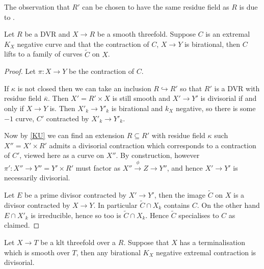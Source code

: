 \documentclass[a4paper,12pt]{amsart}
\begin{document}
	The observation that $R'$ can be chosen to have the same residue field as $R$ is due to \cite[Lemma 3.6]{egbert2016log}.
	
	\begin{theorem}\label{curves}
		Let $R$ be a DVR and $X \to R$ be a smooth threefold. Suppose $C$ is an extremal $K_{X}$ negative curve and that the contraction of $C$, $X\to Y$ is birational, then $C$ lifts to a family of curves $\tilde{C}$ on $X$. 
	\end{theorem}
	
	\begin{proof}
		
		Let $\pi:X \to Y$ be the contraction of $C$. 
		
		If $\kappa$ is not closed then we can take an inclusion $R \hookrightarrow R'$ so that $R'$ is a DVR with residue field $\bar{\kappa}$. Then $X'=R'\times X$ is still smooth and $X' \to Y'$ is divisorial if and only if $X \to Y$ is. Then $X'_{k} \to Y'_{k}$ is birational and $k_{X}$ negative, so there is some $-1$ curve, $C'$ contracted by $X'_{k} \to Y'_{k}$. 
		
		Now by \autoref{KU} we can find an extension $R \subseteq R'$ with residue field $\kappa$ such $X''=X'\times R'$ admits a divisorial contraction which corresponds to a contraction of $C'$, viewed here as a curve on $X''$. By construction, however $\pi':X'' \to Y''=Y'\times R'$ must factor as $X''\xrightarrow{\phi} Z \to Y''$, and hence $X' \to Y'$ is necessarily divisorial.
		
		Let $E$ be a prime divisor contracted by $X' \to Y'$, then the image $\tilde{C}$ on $X$ is a divisor contracted by $X \to Y$. In particular $\tilde{C} \cap X_{k}$ contains $C$. On the other hand $E\cap X'_{k}$ is irreducible, hence so too is $\tilde{C} \cap X_{k}$. Hence $\tilde{C}$ specialises to $C$ as claimed.

	\end{proof}

	\begin{lemma}\label{lifting}
		
		Let $X \to T$ be a klt threefold over a $R$. Suppose that $X$ has a terminalisation which is smooth over $T$, then any birational $K_{X}$ negative extremal contraction is divisorial.
		
	\end{lemma}
	
\end{document}
